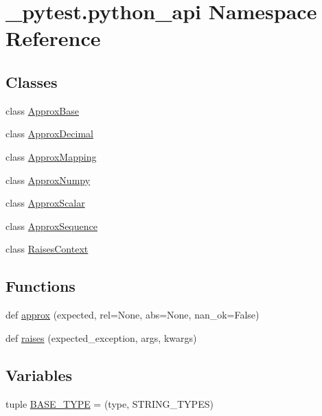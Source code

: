 \hypertarget{namespace__pytest_1_1python__api}{}\section{\+\_\+pytest.\+python\+\_\+api Namespace Reference}
\label{namespace__pytest_1_1python__api}
\subsection*{Classes}
\begin{DoxyCompactItemize}
\item 
class \hyperlink{class__pytest_1_1python__api_1_1_approx_base}{Approx\+Base}
\item 
class \hyperlink{class__pytest_1_1python__api_1_1_approx_decimal}{Approx\+Decimal}
\item 
class \hyperlink{class__pytest_1_1python__api_1_1_approx_mapping}{Approx\+Mapping}
\item 
class \hyperlink{class__pytest_1_1python__api_1_1_approx_numpy}{Approx\+Numpy}
\item 
class \hyperlink{class__pytest_1_1python__api_1_1_approx_scalar}{Approx\+Scalar}
\item 
class \hyperlink{class__pytest_1_1python__api_1_1_approx_sequence}{Approx\+Sequence}
\item 
class \hyperlink{class__pytest_1_1python__api_1_1_raises_context}{Raises\+Context}
\end{DoxyCompactItemize}
\subsection*{Functions}
\begin{DoxyCompactItemize}
\item 
def \hyperlink{namespace__pytest_1_1python__api_a70e8904dd5c406d57f3cb4897d02830c}{approx} (expected, rel=None, abs=None, nan\+\_\+ok=False)
\item 
def \hyperlink{namespace__pytest_1_1python__api_aaa3a9d5e292629d192415ffdb2843bc3}{raises} (expected\+\_\+exception, args, kwargs)
\end{DoxyCompactItemize}
\subsection*{Variables}
\begin{DoxyCompactItemize}
\item 
tuple \hyperlink{namespace__pytest_1_1python__api_acd2ec62d4c43de74a8a0ef7eb1829f5f}{B\+A\+S\+E\+\_\+\+T\+Y\+PE} = (type, S\+T\+R\+I\+N\+G\+\_\+\+T\+Y\+P\+ES)
\end{DoxyCompactItemize}



